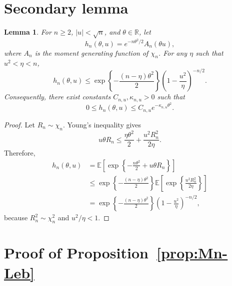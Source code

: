 \documentclass{article}
\newtheorem{lemma}{Lemma}
\begin{document}
\appendix

\section{Secondary lemma}
\label{app:lemma}

\begin{lemma}
\label{lemma:hthetabound}
For \(n\geq2\), \(|u|<\sqrt n\), and \(\theta\in\mathbb R\), let
\begin{equation}
\label{eq:hthetadef2}
  h_n(\theta,u)
  =
  e^{-n\theta^2/2}A_n(\theta u),
\end{equation}
where \(A_n\) is the moment generating function of \(\chi_n\). For any
\(\eta\) such that \(u^2<\eta<n\),
\begin{equation}
\label{eq:hu-env}
  h_n(\theta,u)
  \leq
  \exp\left\{-\frac{(n-\eta)\theta^2}{2}\right\}
  \left(1-\frac{u^2}{\eta}\right)^{-n/2}.
\end{equation}
Consequently, there exist constants \(C_{n,u},\kappa_{n,u}>0\) such
that
\[
  0\leq h_n(\theta,u)
  \leq C_{n,u}e^{-\kappa_{n,u}\theta^2}.
\]
\end{lemma}

\begin{proof}
Let \(R_n\sim\chi_n\). Young's inequality gives
\[
  u\theta R_n
  \leq
  \frac{\eta\theta^2}{2}
  +
  \frac{u^2R_n^2}{2\eta}.
\]
Therefore,
\begin{align*}
  h_n(\theta,u)
  &=
  \mathbb E\left[
    \exp\left\{-\frac{n\theta^2}{2}+u\theta R_n\right\}
  \right]
  \\
  &\leq
  \exp\left\{-\frac{(n-\eta)\theta^2}{2}\right\}
  \mathbb E\left[
    \exp\left\{\frac{u^2R_n^2}{2\eta}\right\}
  \right]
  \\
  &=
  \exp\left\{-\frac{(n-\eta)\theta^2}{2}\right\}
  \left(1-\frac{u^2}{\eta}\right)^{-n/2},
\end{align*}
because \(R_n^2\sim\chi_n^2\) and \(u^2/\eta<1\).
\end{proof}

\section{Proof of Proposition~\ref{prop:Mn-Leb}}
\label{app:proof-Leb}
\end{document}
